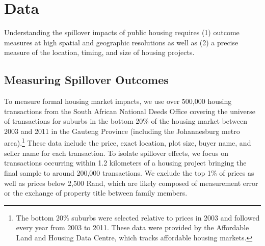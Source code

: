 \documentclass[12pt]{article}
\begin{document}

\section{Data}\label{section:data}

Understanding the spillover impacts of public housing requires (1) outcome measures at high spatial and geographic resolutions as well as (2) a precise measure of the location, timing, and size of housing projects.  

\subsection{Measuring Spillover Outcomes}

To measure formal housing market impacts, we use over 500,000 housing transactions from the South African National Deeds Office covering the universe of transactions for suburbs in the bottom 20\% of the housing market between 2003 and 2011 in the Gauteng Province (including the Johannesburg metro area).\footnote{The bottom 20\% suburbs were selected relative to prices in 2003 and followed every year from 2003 to 2011.  These data were provided by the Affordable Land and Housing Data Centre, which tracks affordable housing markets.}  These data include the price, exact location, plot size, buyer name, and seller name for each transaction.  To isolate spillover effects, we focus on transactions occurring within 1.2 kilometers of a housing project bringing the final sample to around 200,000 transactions.  We exclude the top 1\% of prices as well as prices below 2,500 Rand, which are likely composed of measurement error or the exchange of property title between family members.
\end{document}
